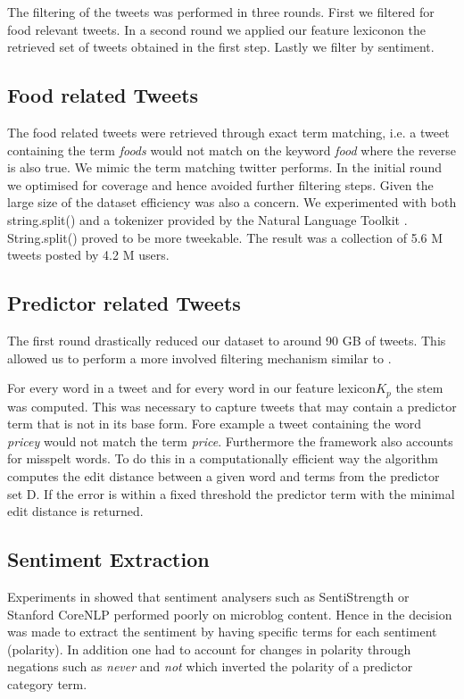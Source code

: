 The filtering of the tweets was performed in three rounds. First we filtered for food relevant tweets. In a second round we applied our feature lexiconon the retrieved set of tweets obtained in the first step. Lastly we filter by sentiment. 

\subsection{Food related Tweets} 

The food related tweets were retrieved through exact term matching, i.e. a tweet containing the term \emph{foods} would not match on the keyword \emph {food} where the reverse is also true. We mimic the term matching twitter performs. In the initial round we optimised for coverage and hence avoided further filtering steps. Given the large size of the dataset efficiency was also a concern. We experimented with both string.split() and a tokenizer provided by the Natural Language Toolkit \cite{Loper2002}. String.split() proved to be more tweekable. The result was a collection of 5.6 M tweets posted by 4.2 M users. 

\subsection{Predictor related Tweets}

The first round  drastically reduced our dataset to around 90 GB of tweets. This allowed us to perform a more involved filtering mechanism similar to \cite{hum14}. 

For every word in a tweet and for every word in our feature lexicon$K_p$ the stem was computed. This was necessary to capture tweets that may contain a predictor term that is not in its base form. Fore example a tweet containing the word \emph{pricey} would not match the term \emph{price}. Furthermore the framework also accounts for misspelt words. To do this in a computationally efficient way the algorithm computes the edit distance between a given word and terms from the predictor set D. If the error is within a fixed threshold the predictor term with the minimal edit distance is returned. 

\subsection{Sentiment Extraction}

Experiments in \cite{hum14} showed that sentiment analysers such as SentiStrength \cite{sent10} or Stanford CoreNLP \cite{stanford2011} performed  poorly on microblog content. Hence in \cite{hum14} the decision was made to extract the sentiment by having specific terms for each sentiment (polarity). In addition one had to account for changes in polarity through negations such as \emph{never} and \emph{not} which inverted the polarity of a predictor category term. 

